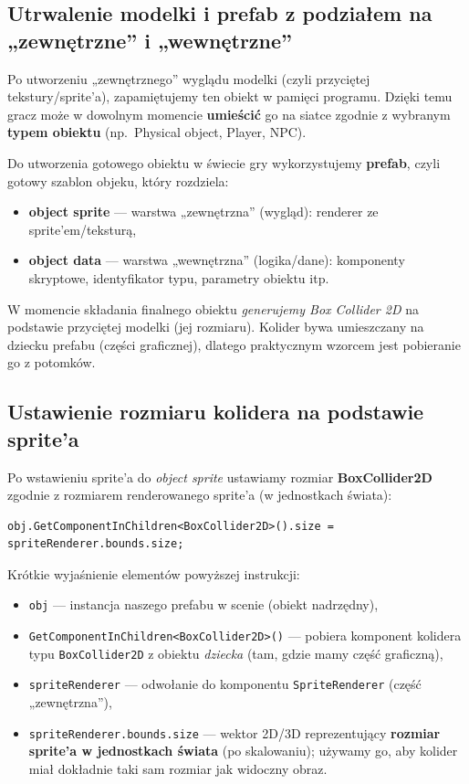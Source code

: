 \documentclass[a4paper,12pt]{book} %
\begin{document}
\subsection*{Utrwalenie modelki i prefab z podziałem na „zewnętrzne” i „wewnętrzne”}

Po utworzeniu „zewnętrznego” wyglądu modelki (czyli przyciętej tekstury/sprite’a), zapamiętujemy ten obiekt w pamięci programu. Dzięki temu gracz może w dowolnym momencie \textbf{umieścić} go na siatce zgodnie z wybranym \textbf{typem obiektu} (np.\ Physical object, Player, NPC).

Do utworzenia gotowego obiektu w świecie gry wykorzystujemy \textbf{prefab}, czyli gotowy szablon objeku, który rozdziela:
\begin{itemize}
  \item \textbf{object sprite} --- warstwa „zewnętrzna” (wygląd): renderer ze sprite’em/teksturą,
  \item \textbf{object data} --- warstwa „wewnętrzna” (logika/dane): komponenty skryptowe, identyfikator typu, parametry obiektu itp.
\end{itemize}
W momencie składania finalnego obiektu \emph{generujemy Box Collider 2D} na podstawie przyciętej modelki (jej rozmiaru). Kolider bywa umieszczany na dziecku prefabu (części graficznej), dlatego praktycznym wzorcem jest pobieranie go z potomków.

\subsection*{Ustawienie rozmiaru kolidera na podstawie sprite’a}

Po wstawieniu sprite’a do \emph{object sprite} ustawiamy rozmiar \textbf{BoxCollider2D} zgodnie z rozmiarem renderowanego sprite’a (w jednostkach świata):

\begin{lstlisting}[language=CSharp, caption={Dopasowanie rozmiaru Box Collider 2D do sprite’a}, label={lst:setcollider}]
obj.GetComponentInChildren<BoxCollider2D>().size = 
spriteRenderer.bounds.size;
\end{lstlisting}

\noindent Krótkie wyjaśnienie elementów powyższej instrukcji:
\begin{itemize}
  \item \texttt{obj} — instancja naszego prefabu w scenie (obiekt nadrzędny),
  \item \texttt{GetComponentInChildren<BoxCollider2D>()} — pobiera komponent kolidera typu \texttt{BoxCollider2D} z obiektu \emph{dziecka} (tam, gdzie mamy część graficzną),
  \item \texttt{spriteRenderer} — odwołanie do komponentu \texttt{SpriteRenderer} (część „zewnętrzna”),
  \item \texttt{spriteRenderer.bounds.size} — wektor 2D/3D reprezentujący \textbf{rozmiar sprite’a w jednostkach świata} (po skalowaniu); używamy go, aby kolider miał dokładnie taki sam rozmiar jak widoczny obraz.
\end{itemize}
\end{document}
